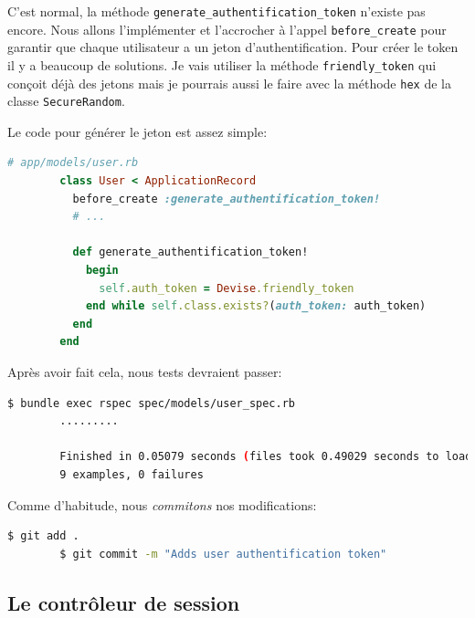\documentclass[]{report}
\begin{document}
      C'est normal, la méthode \verb|generate_authentification_token| n'existe pas encore. Nous allons l'implémenter et l'accrocher à l'appel \verb|before_create|  pour garantir que chaque utilisateur a un jeton d'authentification. Pour créer le token il y a beaucoup de solutions. Je vais utiliser la méthode \verb|friendly_token| qui conçoit déjà des jetons mais je pourrais aussi le faire avec la méthode \verb|hex| de la classe \verb|SecureRandom|.

      Le code pour générer le jeton est assez simple:

      \begin{scriptsize}
        \begin{lstlisting}[language=ruby]
        # app/models/user.rb
        class User < ApplicationRecord
          before_create :generate_authentification_token!
          # ...

          def generate_authentification_token!
            begin
              self.auth_token = Devise.friendly_token
            end while self.class.exists?(auth_token: auth_token)
          end
        end
        \end{lstlisting}
      \end{scriptsize}

      Après avoir fait cela, nous tests devraient passer:

      \begin{scriptsize}
        \begin{lstlisting}[language=bash]
        $ bundle exec rspec spec/models/user_spec.rb
        .........

        Finished in 0.05079 seconds (files took 0.49029 seconds to load)
        9 examples, 0 failures
        \end{lstlisting}
      \end{scriptsize}

      Comme d'habitude, nous \textit{commitons} nos modifications:

      \begin{scriptsize}
        \begin{lstlisting}[language=bash]
        $ git add .
        $ git commit -m "Adds user authentification token"
        \end{lstlisting}
      \end{scriptsize}

    \subsection{Le contrôleur de session}
\end{document}
